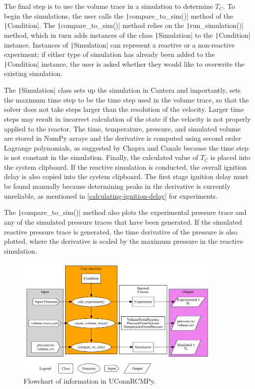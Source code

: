 \documentclass[12pt]{../ussci}
\begin{document}
The final step is to use the volume trace in a simulation to determine
\(T_C\). To begin the simulations, the user calls the
\texttt|compare_to_sim()| method of the \texttt|Condition|. The
\texttt|compare_to_sim()| method relies on the
\texttt|run_simulation()| method, which in turn adds instances of the
class \texttt|Simulation| to the \texttt|Condition| instance. Instances
of \texttt|Simulation| can represent a reactive or a non-reactive
experiment; if either type of simulation has already been added to the
\texttt|Condition| instance, the user is asked whether they would like
to overwrite the existing simulation.

The \texttt|Simulation| class sets up the simulation in Cantera and
importantly, sets the maximum time step to be the time step used in the
volume trace, so that the solver does not take steps larger than the
resolution of the velocity. Larger time steps may result in incorrect
calculation of the state if the velocity is not properly applied to the
reactor. The time, temperature, pressure, and simulated volume are
stored in NumPy arrays \autocite{vanderWalt2011} and the derivative is
computed using second order Lagrange polynomials, as suggested by Chapra
and Canale \autocite{Chapra2010} because the time step is not constant
in the simulation. Finally, the calculated value of \(T_C\) is placed
into the system clipboard. If the reactive simulation is conducted, the
overall ignition delay is also copied into the system clipboard. The
first stage ignition delay must be found manually because determining
peaks in the derivative is currently unreliable, as mentioned in
\cref{calculating-ignition-delay} for experiments.

The \texttt|compare_to_sim()| method also plots the experimental
pressure trace and any of the simulated pressure traces that have been
generated. If the simulated reactive pressure trace is generated, the
time derivative of the pressure is also plotted, where the derivative is
scaled by the maximum pressure in the reactive simulation.

\begin{figure}[htbp]
\centering
\includegraphics[width=0.9\textwidth]{figures/flowchart.png}
\caption{Flowchart of information in UConnRCMPy.}
\label{fig:flowchart}
\end{figure}
\end{document}
